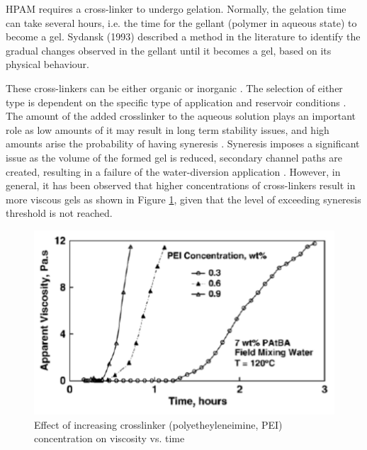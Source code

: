 HPAM requires a cross-linker to undergo gelation. Normally, the gelation time can take several hours, i.e. the time for the gellant (polymer in aqueous state) to become a gel. \cite{Sydansk1993} Sydansk (1993) described a method in the literature to identify the gradual changes observed in the gellant until it becomes a gel, based on its physical behaviour.

These cross-linkers can be either organic or inorganic \citep{Al-Muntasheri2012}. The selection of either type is dependent on the specific type of application and reservoir conditions \citep{Ball1984}. The amount of the added crosslinker to the aqueous solution plays an important role as low amounts of it may result in long term stability issues, and high amounts arise the probability of having syneresis \citep{Sydansk1993, eggert1992}. Syneresis imposes a significant issue as the volume of the formed gel is reduced, secondary channel paths are created, resulting in a failure of the water-diversion application \citep{Al-Muntasheri2007}. However, in general, it has been observed that higher concentrations of cross-linkers result in more viscous gels as shown in Figure \ref{fig:crosslinkerConc}, given that the level of exceeding syneresis threshold is not reached.

\begin{figure}
    \centering
    \includegraphics[width=\textwidth]{img/fig/crosslinkerConc.png}
    \caption{Effect of increasing crosslinker (polyetheyleneimine, PEI) concentration on viscosity vs. time \citep{Al-Muntasheri2007}}
    \label{fig:crosslinkerConc} %
\end{figure}

